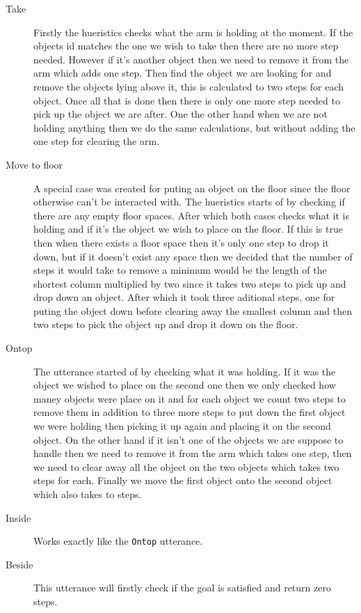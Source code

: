 \begin{description}
  \item[Take] Firstly the hueristics checks what the arm is holding at the moment.
    If the objects id matches the one we wish to take then there are no more step needed.
    However if it's another object then we need to remove it from the arm which adds one step.
    Then find the object we are looking for and remove the objects lying above it, this is calculated to two steps for each object.
    Once all that is done then there is only one more step needed to pick up the object we are after.
    One the other hand when we are not holding anything then we do the same calculations, but without adding the one step for clearing the arm.
  \item[Move to floor] A special case was created for puting an object on the floor since the floor otherwise can't be interacted with.
    The hueristics starts of by checking if there are any empty floor spaces.
    After which both cases checks what it is holding and if it's the object we wish to place on the floor.
    If this is true then when there exists a floor space then it's only one step to drop it down, but if it doesn't exist any space then we decided that the number of steps it would take to remove a minimum would be the length of the shortest column multiplied by two since it takes two steps to pick up and drop down an object.
    After which it took three aditional steps, one for puting the object down before clearing away the smallest column and then two steps to pick the object up and drop it down on the floor.
  \item[Ontop] The utterance started of by checking what it was holding.
    If it was the object we wished to place on the second one then we only checked how maney objects were place on it and for each object we count two steps to remove them in addition to three more steps to put down the first object we were holding then picking it up again and placing it on the second object.
    On the other hand if it isn't one of the objects we are suppose to handle then we need to remove it from the arm which takes one step, then we need to clear away all the object on the two objects which takes two steps for each.
    Finally we move the first object onto the second object which also takes to steps.
  \item[Inside] Works exactly like the \verb|Ontop| utterance.
  \item[Beside] This utterance will firstly check if the goal is satisfied and return zero steps.

\end{description}
